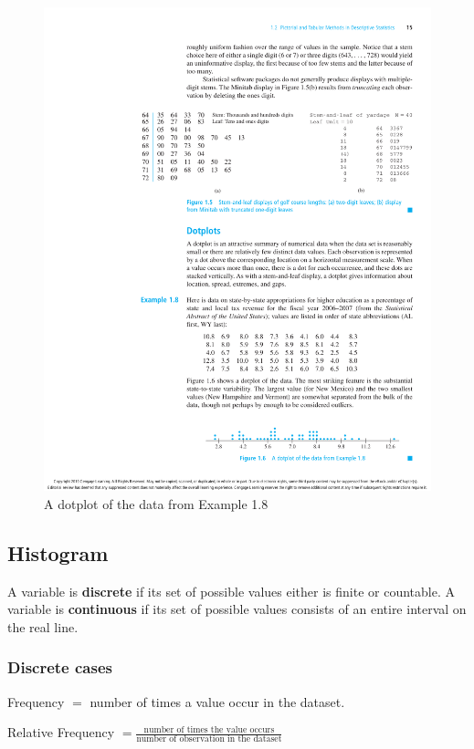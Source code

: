 \begin{figure}[H]
\centering
\includegraphics{figures/barplot.pdf}
\caption{A dotplot of the data from Example 1.8}
\label{fig:1}
\end{figure}


\subsection{Histogram}
\begin{defn}
A variable is \textbf{discrete} if its set of possible values either is finite or countable.
A variable is \textbf{continuous} if its set of possible values consists of an entire interval on the real line.
\end{defn}

\subsubsection{Discrete cases}
Frequency $ = $ number of times a value occur in the dataset.

Relative Frequency $ = \frac{\text{number of times the value occurs}}{\text{number of observation in the dataset}}$

